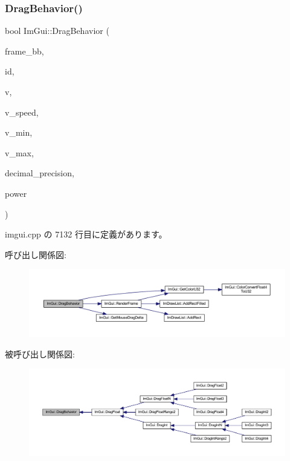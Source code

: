 \subsubsection{\texorpdfstring{Drag\+Behavior()}{DragBehavior()}}
{\footnotesize\ttfamily bool Im\+Gui\+::\+Drag\+Behavior (\begin{DoxyParamCaption}\item[{const \mbox{\hyperlink{struct_im_rect}{Im\+Rect}} \&}]{frame\+\_\+bb,  }\item[{\mbox{\hyperlink{imgui_8h_a1785c9b6f4e16406764a85f32582236f}{Im\+Gui\+ID}}}]{id,  }\item[{float $\ast$}]{v,  }\item[{float}]{v\+\_\+speed,  }\item[{float}]{v\+\_\+min,  }\item[{float}]{v\+\_\+max,  }\item[{int}]{decimal\+\_\+precision,  }\item[{float}]{power }\end{DoxyParamCaption})}



 imgui.\+cpp の 7132 行目に定義があります。

呼び出し関係図\+:\nopagebreak
\begin{figure}[H]
\begin{center}
\leavevmode
\includegraphics[width=350pt]{namespace_im_gui_a4fdcba60dbe3762a144051add234ea48_cgraph}
\end{center}
\end{figure}
被呼び出し関係図\+:\nopagebreak
\begin{figure}[H]
\begin{center}
\leavevmode
\includegraphics[width=350pt]{namespace_im_gui_a4fdcba60dbe3762a144051add234ea48_icgraph}
\end{center}
\end{figure}
\mbox{\label{namespace_im_gui_ac62335909eaaa63a1ead0226e836baeb}} 
